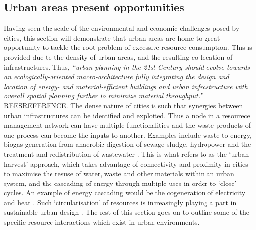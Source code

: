 \subsection{Urban areas present opportunities}
\label{sec:urbanOpps}
Having seen the scale of the environmental and economic challenges posed by cities, this section will demonstrate that urban areas are home to great opportunity to tackle the root problem of excessive resource consumption. This is provided due to the density of urban areas, and the resulting co-location of infrastructures. Thus, \emph{``urban planning in the 21st Century should evolve towards an ecologically-oriented macro-architecture fully integrating the design and location of energy- and material-efficient buildings and urban infrastructure with overall spatial planning further to minimize material throughput.''} REESREFERENCE. The dense nature of cities is such that synergies between urban infrastructures can be identified and exploited. Thus a node in a resourece management network can have multiple functionalities and the waste products of one process can become the inputs to another. Examples include waste-to-energy, biogas generation from anaerobic digestion of sewage sludge, hydropower and the treatment and redistribution of wastewater \citep{Kharrazi2012}. This is what \citet{Leduc2010} refers to as the `urban harvest' approach, which takes advantage of connectivity and proximity in cities to maximise the resuse of water, waste and other materials within an urban system, and the cascading of energy through multiple uses in order to `close' cycles. An example of energy cascading would be the cogeneration of electricity and heat \citep{Grubler2009}. Such `circularisation' of resources is increasingly playing a part in sustainable urban design \citep{Meijer2011}. The rest of this section goes on to outline some of the specific resource interactions which exist in urban environments.

